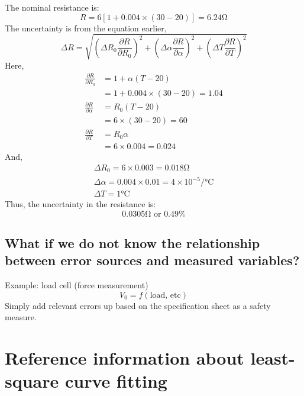\documentclass[class=report, crop=false, 12pt,a4paper]{standalone}
\begin{document}
The nominal resistance is:
\begin{equation}
  R = 6 [1 + 0.004 \times (30 -20)] = 6.24 \si{\ohm}
\end{equation}
The uncertainty is from the equation earlier,
\begin{equation}
  \Delta R = \sqrt{\left(\Delta R_0 \frac{\partial R}{\partial R_0}\right)^2 + \left(\Delta \alpha \frac{\partial R}{\partial \alpha}\right)^2 + \left(\Delta T\frac{\partial R}{\partial T}\right)^2}
\end{equation}
Here,
\begin{align}
  \frac{\partial R}{\partial R_0} &= 1 + \alpha (T-20)\\
  &= 1 + 0.004 \times (30 -20) = 1.04\\
  \frac{\partial R}{\partial \alpha} &= R_0 (T-20)\\
  &= 6 \times (30-20) = 60\\
  \frac{\partial R}{\partial T} &= R_0 \alpha\\
  &= 6 \times 0.004 = 0.024
\end{align}
And, 
\begin{gather}
  \Delta R_0 = 6 \times 0.003 = 0.018 \si{\ohm}\\
  \Delta \alpha = 0.004 \times 0.01 = 4 \times 10^{-5} \si{\per\celsius}\\
  \Delta T = 1 \si{\celsius}
\end{gather}
Thus, the uncertainty in the resistance is:
\begin{equation}
  0.0305 \si{\ohm} \textrm{ or } 0.49 \%
\end{equation}
\subsection{What if we do not know the relationship between error sources and measured variables?}
Example: load cell (force measurement)
\begin{equation}
  V_0 = f(\textrm{load, etc})
\end{equation}
Simply add relevant errors up based on the specification sheet as a safety measure.
\section{Reference information about least-square curve fitting}
\end{document}
